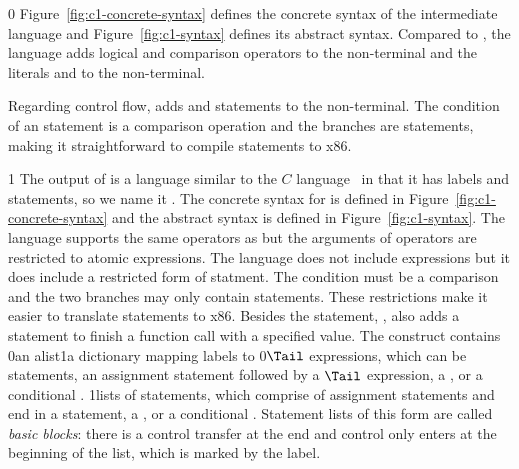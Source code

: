 \documentclass[7x10,nocrop]{TimesAPriori_MIT}%
\def\racketEd{0}
\def\pythonEd{1}
\def\edition{1}
\newcommand{\racket}[1]{{\if\edition\racketEd{#1}\fi}}
\newcommand{\python}[1]{{\if\edition\pythonEd #1\fi}}
\begin{document}
{\if\edition\racketEd
%
Figure~\ref{fig:c1-concrete-syntax} defines the concrete syntax of the
\LangCIf{} intermediate language and Figure~\ref{fig:c1-syntax}
defines its abstract syntax. Compared to \LangCVar{}, the \LangCIf{}
language adds logical and comparison operators to the \Exp{}
non-terminal and the literals \TRUE{} and \FALSE{} to the \Arg{}
non-terminal.

Regarding control flow, \LangCIf{} adds  and 
statements to the \Tail{} non-terminal. The condition of an 
statement is a comparison operation and the branches are 
statements, making it straightforward to compile  statements
to x86.
%
\fi}
%
{\if\edition\pythonEd
%
The output of  is a language similar to the
$C$ language~\citep{Kernighan:1988nx} in that it has labels and
 statements, so we name it \LangCIf{}.  The
concrete syntax for \LangCIf{} is defined in
Figure~\ref{fig:c1-concrete-syntax}
and the abstract syntax is defined in Figure~\ref{fig:c1-syntax}.
%
The \LangCIf{} language supports the same operators as \LangIf{} but
the arguments of operators are restricted to atomic expressions. The
\LangCIf{} language does not include  expressions but it does
include a restricted form of  statment. The condition must be
a comparison and the two branches may only contain 
statements. These restrictions make it easier to translate 
statements to x86. 
%
\fi}
%
Besides the  statement, \LangCIf{}, also adds a
 statement to finish a function call with a specified value.
%
The  construct contains
%
\racket{an alist}\python{a dictionary}
%
mapping labels to
\racket{$\Tail$ expressions, which can be  statements,
an assignment statement followed by a $\Tail$ expression, a
\code{goto}, or a conditional .}
\python{lists of statements, which comprise of assignment statements
  and end in a \code{return} statement, a \code{goto}, or a
  conditional \code{goto}.
  \index{subject}{basic block}
  Statement lists of this form are called
  \emph{basic blocks}: there is a control transfer at the end and
  control only enters at the beginning of the list, which is marked by
  the label. }

\newcommand{\CifGrammarRacket}{
\begin{array}{lcl}
\Atm &::=& \itm{bool} \\
\itm{cmp} &::= & \code{eq?} \MID \code{<} \MID \code{<=} \MID \code{>} \MID \code{>=} \\
\Exp &::=& \CNOT{\Atm} \MID \LP \itm{cmp}~\Atm~\Atm\RP \\
\Tail &::= & \key{goto}~\itm{label}\key{;}\\
   &\MID& \key{if}~\LP \itm{cmp}~\Atm~\Atm \RP~ \key{goto}~\itm{label}\key{;} ~\key{else}~\key{goto}~\itm{label}\key{;} 
\end{array}
}
\end{document}
